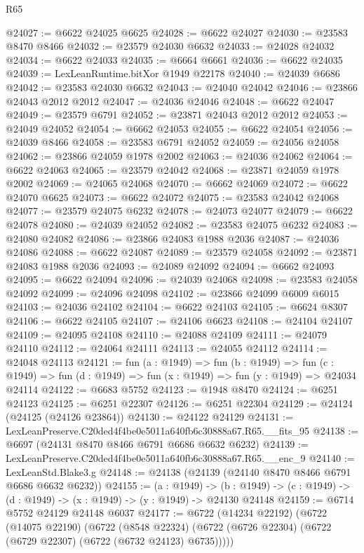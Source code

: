 \begin{lexlean}{R65}
\begin{coremodule}
{@24027 := @6622 @24025 @6625
@24028 := @6622 @24027
@24030 := @23583 @8470 @8466
@24032 := @23579 @24030 @6632
@24033 := @24028 @24032
@24034 := @6622 @24033
@24035 := @6664 @6661
@24036 := @6622 @24035
@24039 := LexLeanRuntime.bitXor @1949 @22178
@24040 := @24039 @6686
@24042 := @23583 @24030 @6632
@24043 := @24040 @24042
@24046 := @23866 @24043 @2012 @2012
@24047 := @24036 @24046
@24048 := @6622 @24047
@24049 := @23579 @6791
@24052 := @23871 @24043 @2012 @2012
@24053 := @24049 @24052
@24054 := @6662 @24053
@24055 := @6622 @24054
@24056 := @24039 @8466
@24058 := @23583 @6791 @24052
@24059 := @24056 @24058
@24062 := @23866 @24059 @1978 @2002
@24063 := @24036 @24062
@24064 := @6622 @24063
@24065 := @23579 @24042
@24068 := @23871 @24059 @1978 @2002
@24069 := @24065 @24068
@24070 := @6662 @24069
@24072 := @6622 @24070 @6625
@24073 := @6622 @24072
@24075 := @23583 @24042 @24068
@24077 := @23579 @24075 @6232
@24078 := @24073 @24077
@24079 := @6622 @24078
@24080 := @24039 @24052
@24082 := @23583 @24075 @6232
@24083 := @24080 @24082
@24086 := @23866 @24083 @1988 @2036
@24087 := @24036 @24086
@24088 := @6622 @24087
@24089 := @23579 @24058
@24092 := @23871 @24083 @1988 @2036
@24093 := @24089 @24092
@24094 := @6662 @24093
@24095 := @6622 @24094
@24096 := @24039 @24068
@24098 := @23583 @24058 @24092
@24099 := @24096 @24098
@24102 := @23866 @24099 @6009 @6015
@24103 := @24036 @24102
@24104 := @6622 @24103
@24105 := @6624 @8307
@24106 := @6622 @24105
@24107 := @24106 @6623
@24108 := @24104 @24107
@24109 := @24095 @24108
@24110 := @24088 @24109
@24111 := @24079 @24110
@24112 := @24064 @24111
@24113 := @24055 @24112
@24114 := @24048 @24113
@24121 := fun (a : @1949) =>
  fun (b : @1949) =>
  fun (c : @1949) => fun (d : @1949) => fun (x : @1949) => fun (y : @1949) => @24034 @24114
@24122 := @6683 @5752
@24123 := @1948 @8470
@24124 := @6251 @24123
@24125 := @6251 @22307
@24126 := @6251 @22304
@24129 := @24124 (@24125 (@24126 @23864))
@24130 := @24122 @24129
@24131 := LexLeanPreserve.C20ded4f4be0e5011a640fb6c30888a67.R65.__fits_95
@24138 := @6697 (@24131 @8470 @8466 @6791 @6686 @6632 @6232)
@24139 := LexLeanPreserve.C20ded4f4be0e5011a640fb6c30888a67.R65.__enc_9
@24140 := LexLeanStd.Blake3.g
@24148 := @24138 (@24139 (@24140 @8470 @8466 @6791 @6686 @6632 @6232))
@24155 := (a : @1949) ->
  (b : @1949) -> (c : @1949) -> (d : @1949) -> (x : @1949) -> (y : @1949) -> @24130 @24148
@24159 := @6714 @5752 @24129 @24148 @6037
@24177 := @6722
    (@14234 @22192)
    (@6722
      (@14075 @22190)
      (@6722
        (@8548 @22324)
        (@6722 (@6726 @22304) (@6722 (@6729 @22307) (@6722 (@6732 @24123) @6735)))))
}
\end{coremodule}
\end{lexlean}
